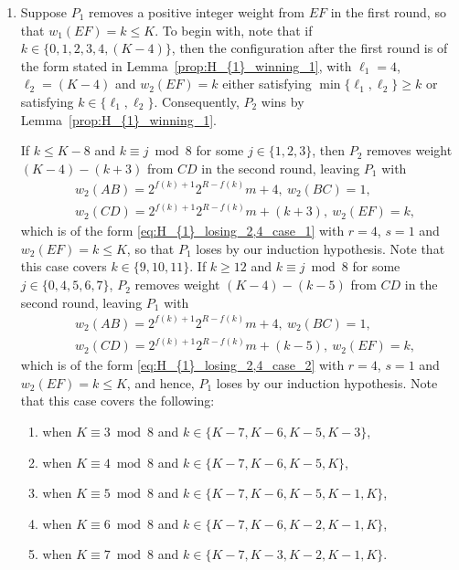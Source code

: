 \documentclass[11pt,reqno]{amsart}
\theoremstyle{definition}
\theoremstyle{definition}
\begin{document}
\begin{enumerate}
\item Suppose $P_{1}$ removes a positive integer weight from $EF$ in the first round, so that $w_{1}(EF)=k \leqslant K$. To begin with, note that if $k\in \{0,1,2,3,4,(K-4)\}$, then the configuration after the first round is of the form stated in Lemma~\ref{prop:H_{1}_winning_1}, with $\ell_{1}=4$, $\ell_{2}=(K-4)$ and $w_{2}(EF)=k$ either satisfying $\min\{\ell_{1},\ell_{2}\}\geqslant k$ or satisfying $k \in \{\ell_{1},\ell_{2}\}$. Consequently, $P_{2}$ wins by Lemma~\ref{prop:H_{1}_winning_1}.

If $k \leqslant K-8$ and $k \equiv j \bmod 8$ for some $j \in \{1,2,3\}$, then $P_{2}$ removes weight $(K-4)-(k+3)$ from $CD$ in the second round, leaving $P_{1}$ with
\begin{align}
{}&w_{2}(AB)=2^{f(k)+1}2^{R-f(k)}m+4,\ w_{2}(BC)=1,\nonumber\\
{}&w_{2}(CD)=2^{f(k)+1}2^{R-f(k)}m+(k+3),\ w_{2}(EF)=k,\nonumber
\end{align}
which is of the form \eqref{eq:H_{1}_losing_2,4_case_1} with $r=4$, $s=1$ and $w_{2}(EF)=k\leqslant K$, so that $P_{1}$ loses by our induction hypothesis. Note that this case covers $k \in \{9,10,11\}$. If $k \geqslant 12$ and $k \equiv j \bmod 8$ for some $j \in \{0,4,5,6,7\}$, $P_{2}$ removes weight $(K-4)-(k-5)$ from $CD$ in the second round, leaving $P_{1}$ with
\begin{align}
{}&w_{2}(AB)=2^{f(k)+1}2^{R-f(k)}m+4,\ w_{2}(BC)=1,\nonumber\\
{}&w_{2}(CD)=2^{f(k)+1}2^{R-f(k)}m+(k-5),\ w_{2}(EF)=k,\nonumber
\end{align}
which is of the form \eqref{eq:H_{1}_losing_2,4_case_2} with $r=4$, $s=1$ and $w_{2}(EF)=k\leqslant K$, and hence, $P_{1}$ loses by our induction hypothesis. Note that this case covers the following:
\begin{enumerate}
\item when $K \equiv 3 \bmod 8$ and $k \in \{K-7,K-6,K-5,K-3\}$,
\item when $K \equiv 4 \bmod 8$ and $k \in \{K-7,K-6,K-5,K\}$,
\item when $K \equiv 5 \bmod 8$ and $k \in \{K-7,K-6,K-5,K-1,K\}$,
\item when $K \equiv 6 \bmod 8$ and $k \in \{K-7,K-6,K-2,K-1,K\}$,
\item when $K \equiv 7 \bmod 8$ and $k \in \{K-7,K-3,K-2,K-1,K\}$.
\end{enumerate}


\end{enumerate}
\end{document}
